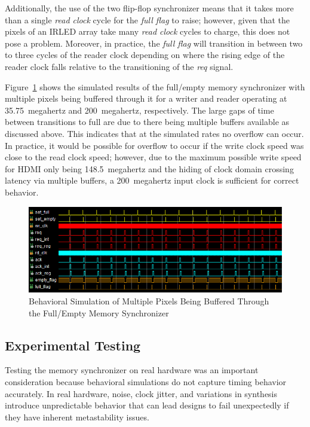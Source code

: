         Additionally, the use of the two flip-flop synchronizer means that it takes more than a single {\it read clock} cycle for the {\it full flag} to raise; however, given that the pixels of an IRLED array take many {\it read clock} cycles to charge, this does not pose a problem. Moreover, in practice, the {\it full flag} will transition in between two to three cycles of the reader clock depending on where the rising edge of the reader clock falls relative to the transitioning of the {\it req} signal.

        Figure~\ref{fig:full_empty_row_sim} shows the simulated results of the full/empty memory synchronizer with multiple pixels being buffered through it for a writer and reader operating at \mbox{35.75 megahertz} and \mbox{200 megahertz}, respectively. The large gaps of time between transitions to full are due to there being multiple buffers available as discussed above. This indicates that at the simulated rates no overflow can occur. In practice, it would be possible for overflow to occur if the write clock speed was close to the read clock speed; however, due to the maximum possible write speed for HDMI only being \mbox{148.5 megahertz} and the hiding of clock domain crossing latency via multiple buffers, a \mbox{200 megahertz} input clock is sufficient for correct behavior.

        \begin{figure}[t]
            \centering
            \includegraphics[width=1.0\textwidth]{fig/full_empty_row_sim.png}
            \caption{Behavioral Simulation of Multiple Pixels Being Buffered Through the Full/Empty Memory Synchronizer}
            \label{fig:full_empty_row_sim}
        \end{figure}

    \subsection{Experimental Testing}
        Testing the memory synchronizer on real hardware was an important consideration because behavioral simulations do not capture timing behavior accurately. In real hardware, noise, clock jitter, and variations in synthesis introduce unpredictable behavior that can lead designs to fail unexpectedly if they have inherent metastability issues.

